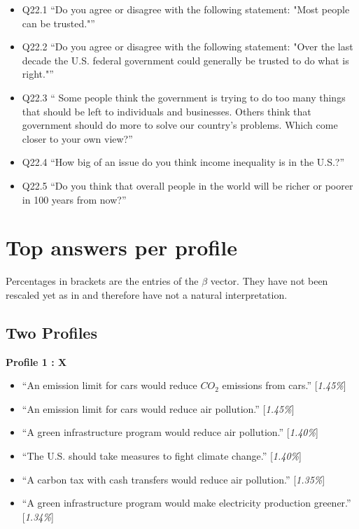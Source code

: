 \documentclass{article}
\begin{document}
\begin{itemize}
    \item Q22.1 ``Do you agree or disagree with the following statement: "Most people can be trusted."''
    \item Q22.2 ``Do you agree or disagree with the following statement: "Over the last decade the U.S. federal government could generally be trusted to do what is right."''
    \item Q22.3 `` Some people think the government is trying to do too many things that should be left to individuals and businesses. Others think that government should do more to solve our country's problems. Which come closer to your own view?''
    \item Q22.4 ``How big of an issue do you think income inequality is in the U.S.?''
    \item Q22.5 ``Do you think that overall people in the world will be richer or poorer in 100 years from now?''
\end{itemize}


\section{Top answers per profile}
Percentages in brackets are the entries of the $\beta$ vector. They have not been rescaled yet as in \cite{draca2020polarized} and therefore have not a natural interpretation.
\subsection{Two Profiles}

\textbf{Profile 1 : X}

\begin{itemize}
    \item ``An emission limit for cars would reduce $CO_2$ emissions from cars.'' [\textit{1.45\%}]
    \item ``An emission limit for cars would reduce air pollution.'' [\textit{1.45\%}]
    \item ``A green infrastructure program would reduce air pollution.'' [\textit{1.40\%}]
    \item ``The U.S. should take measures to fight climate change.'' [\textit{1.40\%}]
    \item ``A carbon tax with cash transfers would reduce air pollution.'' [\textit{1.35\%}]
    \item ``A green infrastructure program would make electricity production greener.'' [\textit{1.34\%}]
\end{itemize}
\end{document}
